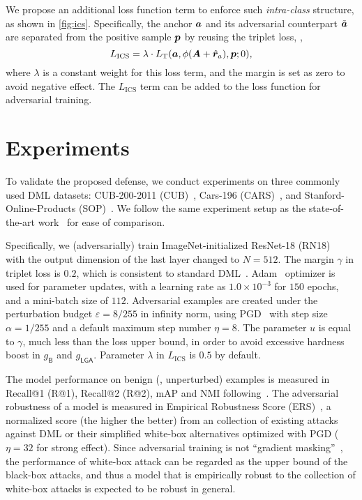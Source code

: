 \documentclass[10pt,twocolumn,letterpaper]{article}
\begin{document}

We propose an additional loss function term to enforce such \emph{intra-class}
structure, as shown in \cref{fig:ics}.
%
Specifically, the anchor ${\bm{a}}$ and its adversarial counterpart $\tilde{{\bm{a}}}$
are separated from the positive sample ${\bm{p}}$ by reusing the triplet loss,
\ie,
%
\begin{equation}
	L_\text{ICS} = \lambda \cdot L_\text{T}(
	{\bm{a}}, \phi({\bm{A}} + \hat{{\bm{r}}}_a), {\bm{p}}; 0),
\end{equation}
%
where $\lambda$ is a constant weight for this loss term,
and the margin is set as zero to avoid negative effect.
%
The $L_\text{ICS}$ term can be added to the loss function for
adversarial training.

\section{Experiments}
\label{sec:4}


To validate the proposed defense, we conduct experiments
on three commonly used DML datasets: CUB-200-2011 (CUB)~\cite{cub200}, Cars-196
(CARS)~\cite{cars196}, and Stanford-Online-Products (SOP)~\cite{sop}.
%
We follow the same experiment setup as the state-of-the-art work~\cite{robrank,revisiting}
for ease of comparison.




Specifically, we (adversarially) train ImageNet-initialized ResNet-18
(RN18)~\cite{resnet} with the output dimension of the last layer changed to
$N{=}512$.
%
The margin $\gamma$ in triplet loss is $0.2$, which is consistent to standard
DML~\cite{revisiting}.
%
Adam~\cite{adam} optimizer is used for parameter updates, with a learning rate
as $1.0{\times}10^{-3}$ for $150$ epochs, and a mini-batch size of $112$.
%
Adversarial examples are created under the perturbation budget
$\varepsilon{=}8/255$ in infinity norm, using PGD~\cite{madry} with step size
$\alpha{=}1/255$ and a default maximum step number $\eta{=}8$.
%
The parameter $u$ is equal to $\gamma$, much less than the loss upper bound,
in order to avoid excessive hardness boost in $g_\mathsf{B}$ and $g_\mathsf{LGA}$.
%
Parameter $\lambda$ in $L_\text{ICS}$ is $0.5$ by default.

The model performance on benign (\ie, unperturbed) examples is measured in
Recall@1 (R@1), Recall@2 (R@2), mAP and NMI
following~\cite{revisiting,robrank}.
%
The adversarial robustness of a model is measured in Empirical Robustness Score
(ERS)~\cite{robrank}, a normalized score (the higher the better) from
an collection of existing attacks against DML or their simplified white-box
alternatives optimized with PGD ($\eta=32$ for strong effect).
%
Since adversarial training is not ``gradient masking''~\cite{obfuscated}, the
performance of white-box attack can be regarded as the upper bound of the
black-box attacks, and thus a model that is empirically robust to the collection
of white-box attacks is expected to be robust in general.
\end{document}
